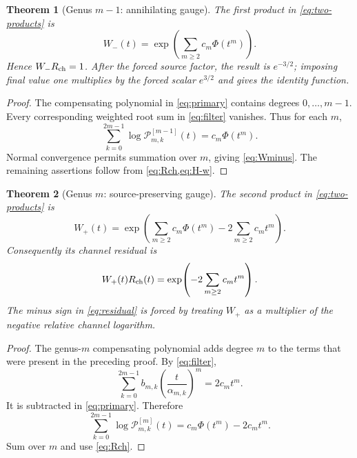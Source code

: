 \documentclass[11pt]{article}
\newtheorem{theorem}{Theorem}[section]
\newcommand{\PP}{\mathcal P}
\begin{document}
\begin{theorem}[Genus \(m-1\): annihilating gauge]\label{thm:genus-minus}
The first product in \cref{eq:two-products} is
\begin{equation}\label{eq:Wminus}
 W_-(t)=\exp\!\left(\sum_{m\ge2}c_m\Phi(t^m)\right).
\end{equation}
Hence \(W_-R_{\rm ch}=1\).  After the forced source factor, the result is
\(e^{-3/2}\); imposing final value one multiplies by the forced scalar
\(e^{3/2}\) and gives the identity function.
\end{theorem}

\begin{proof}
The compensating polynomial in \cref{eq:primary} contains degrees
\(0,\ldots,m-1\).  Every corresponding weighted root sum in
\cref{eq:filter} vanishes.  Thus for each \(m\),
\[
 \sum_{k=0}^{2m-1}\log\PP_{m,k}^{[m-1]}(t)
 =c_m\Phi(t^m).
\]
Normal convergence permits summation over \(m\), giving
\cref{eq:Wminus}.  The remaining assertions follow from
\cref{eq:Rch,eq:H-w}.
\end{proof}

\begin{theorem}[Genus \(m\): source-preserving gauge]\label{thm:genus-source}
The second product in \cref{eq:two-products} is
\begin{equation}\label{eq:Wplus}
 W_+(t)=\exp\!\left(
 \sum_{m\ge2}c_m\Phi(t^m)-2\sum_{m\ge2}c_mt^m
 \right).
\end{equation}
Consequently its channel residual is
\begin{equation}\label{eq:residual}
 W_+(t)R_{\rm ch}(t)
 =\exp\!\left(-2\sum_{m\ge2}c_mt^m\right).
\end{equation}
The minus sign in \cref{eq:residual} is forced by treating \(W_+\) as a
multiplier of the negative relative channel logarithm.
\end{theorem}

\begin{proof}
The genus-\(m\) compensating polynomial adds degree \(m\) to the terms that
were present in the preceding proof.  By \cref{eq:filter},
\begin{equation}\label{eq:first-retained}
 \sum_{k=0}^{2m-1}b_{m,k}
 \left(\frac{t}{\alpha_{m,k}}\right)^m=2c_mt^m.
\end{equation}
It is subtracted in \cref{eq:primary}.  Therefore
\[
 \sum_{k=0}^{2m-1}\log\PP_{m,k}^{[m]}(t)
 =c_m\Phi(t^m)-2c_mt^m.
\]
Sum over \(m\) and use \cref{eq:Rch}.
\end{proof}
\end{document}
